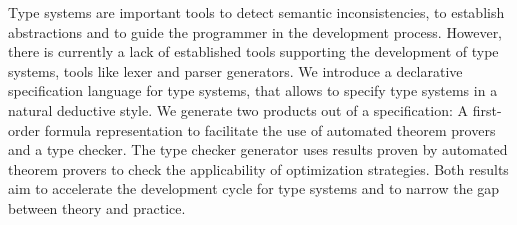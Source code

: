 Type systems are important tools to detect semantic inconsistencies,
to establish abstractions and to guide the programmer in the
development process. However, there is currently a lack of established
tools supporting the development of type systems, tools like lexer and
parser generators. We introduce a declarative specification language
for type systems, that allows to specify type systems in a natural
deductive style. We generate two products out of a specification: A
first-order formula representation to facilitate the use of automated
theorem provers and a type checker. The type checker generator uses
results proven by automated theorem provers to check the applicability
of optimization strategies. Both results aim to accelerate the
development cycle for type systems and to narrow the gap between
theory and practice.

